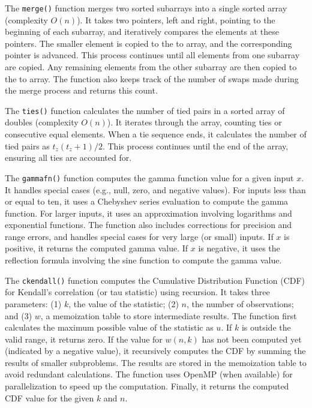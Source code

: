 \documentclass[
  10pt,
  letterpaper,
]{article}
\begin{document}
The \texttt{merge()} function merges two sorted subarrays into a single
sorted array (complexity \(O(n)\)). It takes two pointers, left and
right, pointing to the beginning of each subarray, and iteratively
compares the elements at these pointers. The smaller element is copied
to the to array, and the corresponding pointer is advanced. This process
continues until all elements from one subarray are copied. Any remaining
elements from the other subarray are then copied to the to array. The
function also keeps track of the number of swaps made during the merge
process and returns this count.

The \texttt{ties()} function calculates the number of tied pairs in a
sorted array of doubles (complexity \(O(n)\)). It iterates through the
array, counting ties or consecutive equal elements. When a tie sequence
ends, it calculates the number of tied pairs as \(t_z(t_z + 1) / 2\).
This process continues until the end of the array, ensuring all ties are
accounted for.

The \texttt{gammafn()} function computes the gamma function value for a
given input \(x\). It handles special cases (e.g., null, zero, and
negative values). For inputs less than or equal to ten, it uses a
Chebyshev series evaluation to compute the gamma function. For larger
inputs, it uses an approximation involving logarithms and exponential
functions. The function also includes corrections for precision and
range errors, and handles special cases for very large (or small)
inputs. If \(x\) is positive, it returns the computed gamma value. If
\(x\) is negative, it uses the reflection formula involving the sine
function to compute the gamma value.

The \texttt{ckendall()} function computes the Cumulative Distribution
Function (CDF) for Kendall's correlation (or tau statistic) using
recursion. It takes three parameters: (1) \(k\), the value of the
statistic; (2) \(n\), the number of observations; and (3) \(w\), a
memoization table to store intermediate results. The function first
calculates the maximum possible value of the statistic as \(u\). If
\(k\) is outside the valid range, it returns zero. If the value for
\(w(n,k)\) has not been computed yet (indicated by a negative value), it
recursively computes the CDF by summing the results of smaller
subproblems. The results are stored in the memoization table to avoid
redundant calculations. The function uses OpenMP (when available) for
parallelization to speed up the computation. Finally, it returns the
computed CDF value for the given \(k\) and \(n\).
\end{document}

